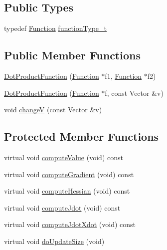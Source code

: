 \subsection*{Public Types}
\begin{DoxyCompactItemize}
\item 
typedef \hyperlink{classocra_1_1Function}{Function} \hyperlink{classocra_1_1DotProductFunction_abdc60b6380ffedc075792224bd908c48}{function\+Type\+\_\+t}
\end{DoxyCompactItemize}
\subsection*{Public Member Functions}
\begin{DoxyCompactItemize}
\item 
\hyperlink{classocra_1_1DotProductFunction_a70f7d2b9c9fefba0203fbee84607c9e9}{Dot\+Product\+Function} (\hyperlink{classocra_1_1Function}{Function} $\ast$f1, \hyperlink{classocra_1_1Function}{Function} $\ast$f2)
\item 
\hyperlink{classocra_1_1DotProductFunction_a369a245fec0cfe2d4f72bfd577ab7ad0}{Dot\+Product\+Function} (\hyperlink{classocra_1_1Function}{Function} $\ast$f, const Vector \&v)
\item 
void \hyperlink{classocra_1_1DotProductFunction_a2c7c65e80d7fb5ac1da43421a792f77b}{changeV} (const Vector \&v)
\end{DoxyCompactItemize}
\subsection*{Protected Member Functions}
\begin{DoxyCompactItemize}
\item 
virtual void \hyperlink{classocra_1_1DotProductFunction_ac0dcd9911e638ebcd8e9594dbf0fa9ed}{compute\+Value} (void) const
\item 
virtual void \hyperlink{classocra_1_1DotProductFunction_af088997b35bf792a1f1c9c6fb78c0fe1}{compute\+Gradient} (void) const
\item 
virtual void \hyperlink{classocra_1_1DotProductFunction_a97dcdd721c76f80cb20e257aca4f8a58}{compute\+Hessian} (void) const
\item 
virtual void \hyperlink{classocra_1_1DotProductFunction_a707474c43d42fad3a8c5bbd896ca8f4b}{compute\+Jdot} (void) const
\item 
virtual void \hyperlink{classocra_1_1DotProductFunction_a07f6a0a7e676a8849732f3469d70bcae}{compute\+Jdot\+Xdot} (void) const
\item 
virtual void \hyperlink{classocra_1_1DotProductFunction_af943f9e456e44b3cbe108a964697f239}{do\+Update\+Size} (void)
\end{DoxyCompactItemize}
